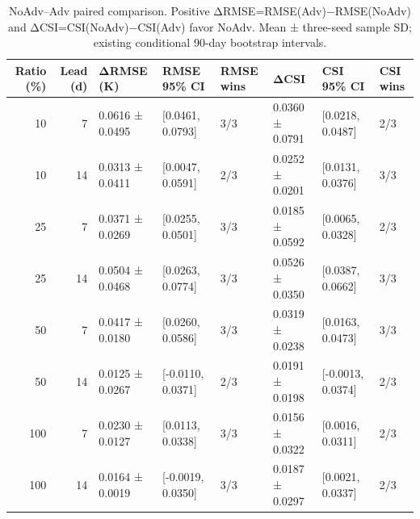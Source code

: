 \begin{table}
\caption{NoAdv–Adv paired comparison. Positive ΔRMSE=RMSE(Adv)−RMSE(NoAdv) and ΔCSI=CSI(NoAdv)−CSI(Adv) favor NoAdv. Mean ± three-seed sample SD; existing conditional 90-day bootstrap intervals.}
\label{tab:noadv_adv}
\begin{tabular}{rrllllll}
\toprule
Ratio (\%) & Lead (d) & ΔRMSE (K) & RMSE 95\% CI & RMSE wins & ΔCSI & CSI 95\% CI & CSI wins \\
\midrule
10 & 7 & 0.0616 ± 0.0495 & [0.0461, 0.0793] & 3/3 & 0.0360 ± 0.0791 & [0.0218, 0.0487] & 2/3 \\
10 & 14 & 0.0313 ± 0.0411 & [0.0047, 0.0591] & 2/3 & 0.0252 ± 0.0201 & [0.0131, 0.0376] & 3/3 \\
25 & 7 & 0.0371 ± 0.0269 & [0.0255, 0.0501] & 3/3 & 0.0185 ± 0.0592 & [0.0065, 0.0328] & 2/3 \\
25 & 14 & 0.0504 ± 0.0468 & [0.0263, 0.0774] & 3/3 & 0.0526 ± 0.0350 & [0.0387, 0.0662] & 3/3 \\
50 & 7 & 0.0417 ± 0.0180 & [0.0260, 0.0586] & 3/3 & 0.0319 ± 0.0238 & [0.0163, 0.0473] & 3/3 \\
50 & 14 & 0.0125 ± 0.0267 & [-0.0110, 0.0371] & 2/3 & 0.0191 ± 0.0198 & [-0.0013, 0.0374] & 2/3 \\
100 & 7 & 0.0230 ± 0.0127 & [0.0113, 0.0338] & 3/3 & 0.0156 ± 0.0322 & [0.0016, 0.0311] & 2/3 \\
100 & 14 & 0.0164 ± 0.0019 & [-0.0019, 0.0350] & 3/3 & 0.0187 ± 0.0297 & [0.0021, 0.0337] & 2/3 \\
\bottomrule
\end{tabular}
\end{table}

